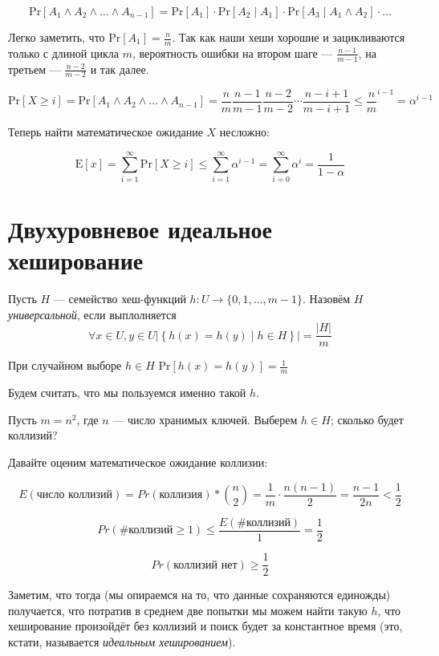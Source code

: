 \documentclass[a4paper,12pt]{article}
\begin{document}
\[\mathrm{Pr}[A_1 \land A_2 \land \ldots \land A_{n-1}] = 
\mathrm{Pr}[A_1] \cdot \mathrm{Pr}[A_2 \mid A_1]\cdot \mathrm{Pr}[A_3\mid A_1\land A_2]\cdot\ldots\]

Легко заметить, что $\mathrm{Pr}[A_1] = \frac{n}{m}$. Так как наши хеши хорошие и зацикливаются только с длиной цикла $m$, вероятность ошибки на втором шаге --- $\frac{n-1}{m-1}$, на третьем --- $\frac{n-2}{m-2}$ и так далее.

\[
    \mathrm{Pr}[X \geqslant i] =
    \mathrm{Pr}[A_1 \land A_2 \land \ldots \land A_{n-1}]=
    \frac{n}{m}\frac{n-1}{m-1}\frac{n-2}{m-2}\cdots\frac{n-i+1}{m-i+1} \leqslant \frac{n}{m}^{i-1} = \alpha^{i-1}
\]

Теперь найти математическое ожидание $X$ несложно:

\[
\mathrm{E}[x] = \sum\limits_{i=1}^\infty \mathrm{Pr}[X\geqslant i] \leqslant
\sum\limits_{i=1}^\infty \alpha^{i-1} =
\sum\limits_{i=0}^\infty \alpha^{i} =
\frac{1}{1-\alpha}
\]

\newpage
\section{Двухуровневое идеальное хеширование}

Пусть $H$ --- семейство хеш-функций $h: U \to \{0, 1, \ldots, m-1\}$. Назовём $H$ \emph{универсальной}, если выплолняется
\[\forall x\in U, y\in U \left|\left\{ h(x) = h(y)\mid h\in H \right\}\right| = \frac{|H|}{m}\]

При случайном выборе $h\in H$ $\mathrm{Pr}[h(x) = h(y)] = \frac{1}{m}$

Будем считать, что мы пользуемся именно такой $h$.

Пусть $m = n^2$, где $n$ --- число хранимых ключей. Выберем $h\in H$; сколько будет коллизий?

Давайте оценим математическое ожидание коллизии:

\[
    E(\text{число коллизий}) = Pr(\text{коллизия})*{n \choose 2} = \frac{1}{m}\cdot\frac{n(n-1)}{2} = \frac{n-1}{2n}<\frac{1}{2}
\]

\[
    Pr(\text{\# коллизий} \geqslant 1) \leqslant \frac{ E(\text{\# коллизий})}{1} = \frac{1}{2}
\]

\[
    Pr(\text{коллизий нет}) \geqslant \frac{1}{2}
\]

Заметим, что тогда (мы опираемся на то, что данные сохраняются единожды) получается, что потратив в среднем две попытки мы можем найти такую $h$, что хеширование произойдёт без коллизий и поиск будет за константное время (это, кстати, называется \emph{идеальным хешированием}).
\end{document}
